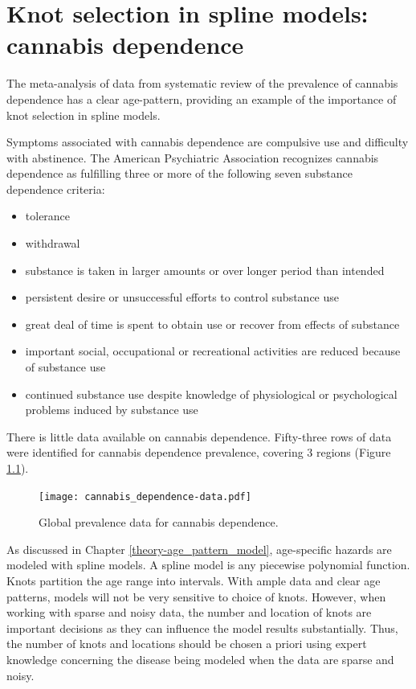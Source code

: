 \chapter{Knot selection in spline models: cannabis dependence}
\label{applications-splines_knot_loc}

The meta-analysis of data from systematic review of the prevalence of cannabis dependence has a clear age-pattern, providing an example of the importance of knot selection in spline models.

Symptoms associated with cannabis dependence are compulsive use and difficulty with abstinence.  The American Psychiatric Association recognizes cannabis dependence as fulfilling three or more of the following seven substance dependence criteria:
    \begin{itemize} 
        \item tolerance
        \item withdrawal
        \item substance is taken in larger amounts or over longer period than intended
        \item persistent desire or unsuccessful efforts to control substance use
        \item great deal of time is spent to obtain use or recover from effects of substance
        \item important social, occupational or recreational activities are reduced because of substance use
        \item continued substance use despite knowledge of physiological or psychological problems induced by substance use \cite{american_diagnostic_2000, coffey_cannabis_2002}
    \end{itemize}

There is little data available on cannabis dependence.  Fifty-three rows of data were identified for cannabis dependence prevalence, covering 3 regions (Figure \ref{fig:app-cannabis_data}).

    \begin{figure}[h]
        \begin{center}
            \texttt{[image: cannabis\_dependence-data.pdf]}
            \caption{Global prevalence data for cannabis dependence.}
            \label{fig:app-cannabis_data}
        \end{center}
    \end{figure}

As discussed in Chapter \ref{theory-age_pattern_model}, age-specific hazards are modeled with spline models.  A spline model is any piecewise polynomial function.  Knots partition the age range into intervals.  With ample data and clear age patterns, models will not be very sensitive to choice of knots.  However, when working with sparse and noisy data, the number and location of knots are important decisions as they can influence the model results substantially.  Thus, the number of knots and locations should be chosen a priori using expert knowledge concerning the disease being modeled when the data are sparse and noisy.


